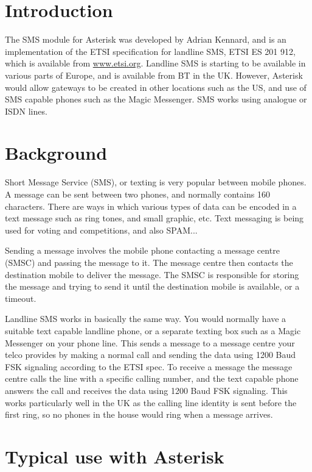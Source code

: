 \section{Introduction}

   The SMS module for Asterisk was developed by Adrian Kennard, and is an
   implementation of the ETSI specification for landline SMS, ETSI ES 201
   912, which is available from \url{www.etsi.org}. Landline SMS is starting to
   be available in various parts of Europe, and is available from BT in
   the UK. However, Asterisk would allow gateways to be created in other
   locations such as the US, and use of SMS capable phones such as the
   Magic Messenger. SMS works using analogue or ISDN lines.

\section{Background}

   Short Message Service (SMS), or texting is very popular between mobile
   phones. A message can be sent between two phones, and normally
   contains 160 characters. There are ways in which various types of data
   can be encoded in a text message such as ring tones, and small
   graphic, etc. Text messaging is being used for voting and
   competitions, and also SPAM...

   Sending a message involves the mobile phone contacting a message
   centre (SMSC) and passing the message to it. The message centre then
   contacts the destination mobile to deliver the message. The SMSC is
   responsible for storing the message and trying to send it until the
   destination mobile is available, or a timeout.

   Landline SMS works in basically the same way. You would normally have
   a suitable text capable landline phone, or a separate texting box such
   as a Magic Messenger on your phone line. This sends a message to a
   message centre your telco provides by making a normal call and sending
   the data using 1200 Baud FSK signaling according to the ETSI spec. To
   receive a message the message centre calls the line with a specific
   calling number, and the text capable phone answers the call and
   receives the data using 1200 Baud FSK signaling. This works
   particularly well in the UK as the calling line identity is sent
   before the first ring, so no phones in the house would ring when a
   message arrives.

\section{Typical use with Asterisk}

